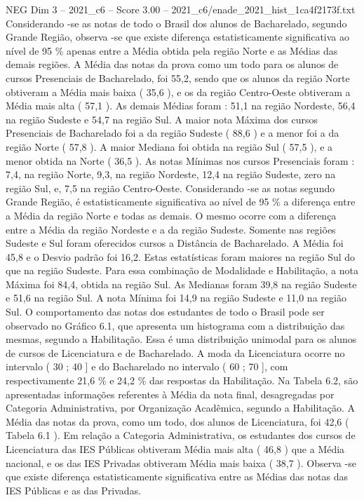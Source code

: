 \begin{textsample}{NEG Dim 3 – 2021\_c6 – Score 3.00 – 2021\_c6/enade\_2021\_hist\_1ca4f2173f.txt}
Considerando -se as notas de todo o Brasil dos alunos de Bacharelado, segundo Grande Região, observa -se que existe diferença estatisticamente significativa ao nível de 95 \% apenas entre a Média obtida pela região Norte e as Médias das demais regiões.
A Média das notas da prova como um todo para os alunos de cursos Presenciais de Bacharelado, foi 55,2, sendo que os alunos da região Norte obtiveram a Média mais baixa ( 35,6 ), e os da região Centro-Oeste obtiveram a Média mais alta ( 57,1 ).
As demais Médias foram : 51,1 na região Nordeste, 56,4 na região Sudeste e 54,7 na região Sul.
A maior nota Máxima dos cursos Presenciais de Bacharelado foi a da região Sudeste ( 88,6 ) e a menor foi a da região Norte ( 57,8 ).
A maior Mediana foi obtida na região Sul ( 57,5 ), e a menor obtida na Norte ( 36,5 ).
As notas Mínimas nos cursos Presenciais foram : 7,4, na região Norte, 9,3, na região Nordeste, 12,4 na região Sudeste, zero na região Sul, e, 7,5 na região Centro-Oeste.
Considerando -se as notas segundo Grande Região, é estatisticamente significativa ao nível de 95 \% a diferença entre a Média da região Norte e todas as demais.
O mesmo ocorre com a diferença entre a Média da região Nordeste e a da região Sudeste.
Somente nas regiões Sudeste e Sul foram oferecidos cursos a Distância de Bacharelado.
A Média foi 45,8 e o Desvio padrão foi 16,2.
Estas estatísticas foram maiores na região Sul do que na região Sudeste.
Para essa combinação de Modalidade e Habilitação, a nota Máxima foi 84,4, obtida na região Sul.
As Medianas foram 39,8 na região Sudeste e 51,6 na região Sul.
A nota Mínima foi 14,9 na região Sudeste e 11,0 na região Sul.
O comportamento das notas dos estudantes de todo o Brasil pode ser observado no Gráfico 6.1, que apresenta um histograma com a distribuição das mesmas, segundo a Habilitação.
Essa é uma distribuição unimodal para os alunos de cursos de Licenciatura e de Bacharelado.
A moda da Licenciatura ocorre no intervalo ( 30 ; 40 ] e do Bacharelado no intervalo ( 60 ; 70 ], com respectivamente 21,6 \% e 24,2 \% das respostas da Habilitação.
Na Tabela 6.2, são apresentadas informações referentes à Média da nota final, desagregadas por Categoria Administrativa, por Organização Acadêmica, segundo a Habilitação.
A Média das notas da prova, como um todo, dos alunos de Licenciatura, foi 42,6 ( Tabela 6.1 ).
Em relação a Categoria Administrativa, os estudantes dos cursos de Licenciatura das IES Públicas obtiveram Média mais alta ( 46,8 ) que a Média nacional, e os das IES Privadas obtiveram Média mais baixa ( 38,7 ).
Observa -se que existe diferença estatisticamente significativa entre as Médias das notas das IES Públicas e as das Privadas.

\end{textsample}
